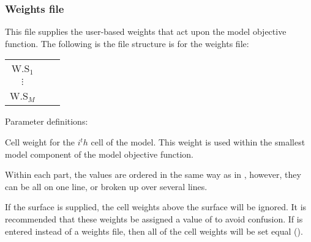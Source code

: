 \subsubsection{Weights file}
This file supplies the user-based weights that act upon the model objective function. The following is the file structure is for the weights file:

\begin{fileExample}
\begin{tabular}{|ccc|}
\hline
W.S$_{1}$ & & \\
$\vdots$ & & \\
W.S$_{M}$ & & \\
\hline
\end{tabular}
\end{fileExample}

Parameter definitions:
\begin{description}[leftmargin=5cm, style=sameline, align=left]
\item[\codeName{W.S$_{i}$}] Cell weight for the $i^th$ cell of the model. This weight is used within the smallest model component of the model objective function.
\end{description}

Within each part, the values are ordered in the same way as in , however, they can be all on one line, or broken up over several lines.

If the surface  is supplied, the cell weights above the surface will be ignored. It is recommended that these weights be assigned a value of  to avoid confusion. If  is entered instead of a weights file, then all of the cell weights will be set equal ().